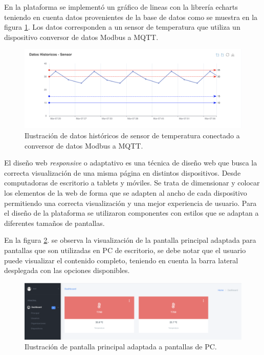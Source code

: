 En la plataforma se implementó un gráfico de lineas con la librería echarts teniendo en cuenta datos provenientes de la base de datos como se muestra en la figura \ref{fig:device-grafica}. Los datos corresponden a un sensor de temperatura que utiliza un dispositivo conversor de datos Modbus a MQTT.

\begin{figure}[htpb]
	\centering
	\includegraphics[scale=.30]{./Figures/device-grafica.png}
	\caption[Componente gráfico de echarts]{Ilustración de datos históricos de sensor de temperatura conectado a conversor de datos Modbus a MQTT.}
	\label{fig:device-grafica}
\end{figure}


El diseño web \textit{responsive} o adaptativo es una técnica de diseño web que busca la correcta visualización de una misma página en distintos dispositivos. Desde computadoras de escritorio a tablets y móviles.  Se trata de dimensionar y colocar los elementos de la web de forma que se adapten al ancho de cada dispositivo permitiendo una correcta visualización y una mejor experiencia de usuario.  Para el diseño de la plataforma se utilizaron componentes con estilos que se adaptan a diferentes tamaños de pantallas. 

En la figura \ref{fig:pantalla-pc}. se observa la visualización de la pantalla principal adaptada para pantallas que son utilizadas en PC de escritorio, se debe notar que el usuario puede visualizar el contenido completo, teniendo en cuenta la barra lateral desplegada con las opciones disponibles. 

\begin{figure}[htpb]
	\centering
	\includegraphics[scale=.20]{./Figures/pantalla-pc.png}
	\caption[Pantalla adaptada a pantallas para PC]{Ilustración de pantalla principal adaptada a pantallas de PC.}
	\label{fig:pantalla-pc}
\end{figure}

